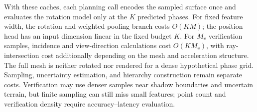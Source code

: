 With these caches, each planning call encodes the sampled surface once and evaluates the rotation model only at the $K$ predicted phases. For fixed feature width, the rotation and weighted-pooling branch costs $O(KM)$; the position head has an input dimension linear in the fixed budget $K$. For $M_v$ verification samples, incidence and view-direction calculations cost $O(KM_v)$, with ray-intersection cost additionally depending on the mesh and acceleration structure. The full mesh is neither rotated nor rendered for a dense hypothetical phase grid. Sampling, uncertainty estimation, and hierarchy construction remain separate costs. Verification may use denser samples near shadow boundaries and uncertain terrain, but finite sampling can still miss small features; point count and verification density require accuracy--latency evaluation.

